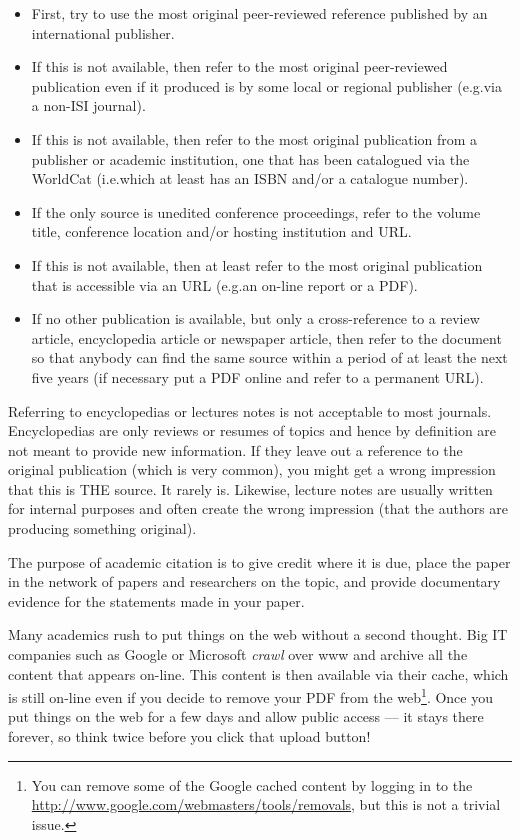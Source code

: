 \documentclass[graybox,envcountchap,sectrefs,UStrade]{svmono}
\begin{document}
\begin{itemize}
  \item First, try to use the most original peer-reviewed reference published by an international publisher.
  \item If this is not available, then refer to the most original peer-reviewed publication even if it produced is by some local or regional publisher (e.g.\@ via a non-ISI journal).
  \item If this is not available, then refer to the most original publication from a publisher or academic institution, one that has been catalogued via the WorldCat (i.e.\@ which at least has an ISBN and/or a catalogue number).
  \item If the only source is unedited conference proceedings, refer to the volume title, conference location and/or hosting institution and URL.
  \item If this is not available, then at least refer to the most original publication that is accessible via an URL (e.g.\@ an on-line report or a PDF).
  \item If no other publication is available, but only a cross-reference to a review article, encyclopedia article or newspaper article, then refer to the document so that anybody can find the same source within a period of at least the next five years (if necessary put a PDF online and refer to a permanent URL).
\end{itemize}

Referring to encyclopedias or lectures notes is not acceptable to most journals. Encyclopedias are only reviews or resumes of topics and hence by definition are not meant to provide new information. If they leave out a reference to the original publication (which is very common), you might get a wrong impression that this is THE source. It rarely is. Likewise, lecture notes are usually written for internal purposes and often create the wrong impression (that the authors are producing something original).\par

\begin{svgraybox}
The purpose of academic citation is to give credit where it is due, place the paper in the network of papers and researchers on the topic, and provide documentary evidence for the statements made in your paper.
\end{svgraybox}\label{R:citations}

Many academics rush to put things on the web without a second thought. Big IT companies such as Google or Microsoft \emph{crawl} over www and archive all the content that appears on-line. This content is then available via their cache, which is still on-line even if you decide to remove your PDF from the web\footnote{You can remove some of the Google cached content by logging in to the \url{http://www.google.com/webmasters/tools/removals}, but this is not a trivial issue.}. Once you put things on the web for a few days and allow public access --- it stays there forever, so think twice before you click that upload button!  \par
\end{document}
